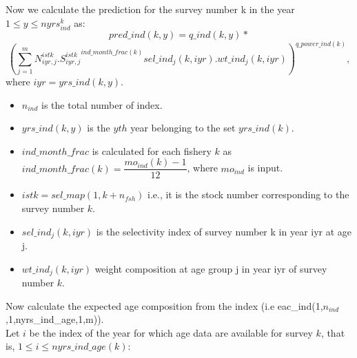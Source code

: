 \documentclass{article}
\begin{document}
Now we calculate the prediction for the survey number k in the year $1\leq y \leq nyrs_{ind}^k$ as:
\begin{equation}
    pred\_ind(k,y)=q\_ind(k,y)*
\end{equation}
\begin{equation}
    \left(\sum_{j=1}^mN^{istk}_{iyr,j}.{S^{istk}_{iyr,j}}^{ind\_month\_frac(k)}sel\_ind_j(k,iyr).wt\_ind_j(k,iyr)\right)^{q\_power\_ind(k)},
\end{equation}
where $iyr=yrs\_ind(k,y)$.
\begin{itemize}
\item $n_{ind}$ is the total number of index.
\item $yrs\_ind(k,y)$ is the $yth$ year belonging to the set $yrs\_ind(k)$.

    \item $ind\_month\_frac$ is calculated for each fishery $k$ as $ind\_month\_frac(k)=\dfrac{mo_{ind}(k)-1}{12}$, where $mo_{ind}$ is input.
    \item $istk=sel\_map(1,k+n_{fsh})$ 
i.e., it is the stock number corresponding to the survey number $k$.
    \item $sel\_ind_j(k,iyr)$ 
is the selectivity index of survey number k in year iyr at age j.
    \item $wt\_ind_j(k,iyr)$ 
weight composition at age group j in year iyr of survey number $k$. %
    \end{itemize}
    Now calculate the expected age composition from the index (i.e eac\_ind(1,$n_{ind}$,1,nyrs\_ind\_age,1,m)).\\
Let $i$ be the index of the year for which age data are available for survey $k$, that is, $1\leq i \leq nyrs\_ind\_age(k)$:
\end{document}
